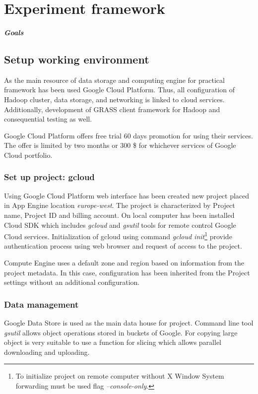 \documentclass[a4paper,12pt,oneside]{report}
\begin{document}
\newpage
\chapter*{Experiment framework}
\paragraph{Goals}


\section{Setup working environment}\label{setup_w_e}
As the main resource of data storage and computing engine for practical framework has been used Google Cloud Platform.
 Thus, all configuration of Hadoop cluster, data storage, and networking is linked to cloud services. Additionally,
  development of GRASS client framework for Hadoop and consequential testing  as well.

Google Cloud Platform offers free trial 60 days promotion for using their services. The offer is limited by two
 months or 300 \$ for whichever services of Google Cloud portfolio.
        \subsection{Set up project: gcloud}
Using Google Cloud Platform web interface has been created new project placed in App Engine 
location \textit{europe-west}. The project is characterized by Project name, Project ID and billing account.
On local computer has been installed Cloud SDK which includes \textit{gcloud} 
and \textit{gsutil} tools for remote control Google Cloud services.
Initialization of gcloud using command \emph{gcloud init}\footnote{To initialize project on remote computer 
without X Window System forwarding must be used flag \emph{--console-only}.} provide authentication process using web browser 
and request of access to the project.

Compute Engine uses a default zone and region based on information from the project metadata. In this case, 
configuration has been inherited from the Project settings without an additional configuration.


\subsection{Data management}
        Google Data Store is used as the main data house for project. Command line tool \textit{gsutil} 
        allows object operations stored in buckets of Google. For copying large object is very suitable to use 
        a function for slicing which allows parallel 
        downloading and uploading.
        
\end{document}
